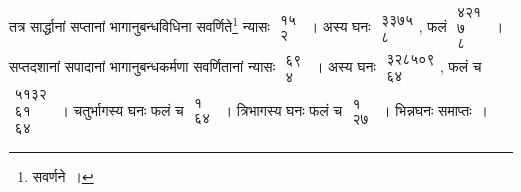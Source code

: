\documentclass[10pt, openany]{book}
\begin{document}
{तत्र सार्द्धानां सप्तानां भागानुबन्धविधिना सवर्णिते\renewcommand{\thefootnote}{\s ४}\footnote{\s सवर्णने~।} न्यासः $\begin{matrix}

\mbox{{१५}}\\

\mbox{{२}}

\end{matrix}$~। अस्य घनः $\begin{matrix}

\mbox{{३३७५}}\\

\mbox{{८}}

\end{matrix}$,}
{फलं $\begin{matrix}

\mbox{{४२१}}\\

\mbox{{७}}\\

\mbox{{८}}

\end{matrix}$~। सप्तदशानां सपादानां भागानुबन्धकर्मणा सवर्णितानां
न्यासः $\begin{matrix}

\mbox{{६९}}\\

\mbox{{४}}

\end{matrix}$~। अस्य घनः $\begin{matrix}

\mbox{{३२८५०९}}\\

\mbox{{६४}}

\end{matrix}$, फलं च $\begin{matrix}

\mbox{{५१३२}}\\

\mbox{{६१}}\\

\mbox{{६४}}

\end{matrix}$~। चतुर्भागस्य घनः फलं च $\begin{matrix}

\mbox{{१}}\\

\mbox{{६४}}

\end{matrix}$~।
त्रिभागस्य घनः फलं च $\begin{matrix}

\mbox{{१}}\\

\mbox{{२७}}

\end{matrix}$~।}
{भिन्नघनः समाप्तः~।}
\vspace{2mm}
\end{document}
